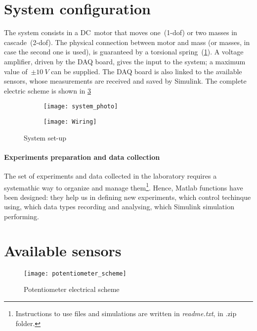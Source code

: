 
\section{System configuration}

The system consists in a DC~motor that moves one~(\acrshort{1-dof}) or two masses in cascade~(\acrshort{2-dof}). The physical connection between motor and mass (or masses, in case the second one is used), is guaranteed by a torsional spring~(\cref{fig:system_setup}).
A voltage amplifier, driven by the DAQ board, gives the input to the system; a maximum value of~$\pm 10 \ V$ can be supplied. The DAQ board is also linked to the available sensors, whose measurements are received and saved by Simulink. The complete electric scheme is shown in \cref{fig:wiring}
\begin{figure}[h]
	\centering
	\begin{subfigure}{0.45\columnwidth}
		\texttt{[image: system\_photo]}
		\label{fig:system_setup}
	\end{subfigure}
	\begin{subfigure}{0.45\columnwidth}
		\centering
		\texttt{[image: Wiring]}
		\label{fig:wiring}
	\end{subfigure}
	\caption{System set-up}
\end{figure}

\paragraph{Experiments preparation and data collection}

The set of experiments and data collected in the laboratory requires a systemathic way to organize and manage them\footnote{Instructions to use files and simulations are written in \textit{readme.txt}, in .zip folder.}. Hence, Matlab functions have been designed: they help us in defining new experiments, which control techinque using, which data types recording and analysing, which Simulink simulation performing.

\section{Available sensors}
\label{sec:sensors}

\begin{wrapfigure}{r}{0.3\textwidth}
	\centering
	\texttt{[image: potentiometer\_scheme]}
	\caption{Potentiometer electrical scheme}
\end{wrapfigure}

